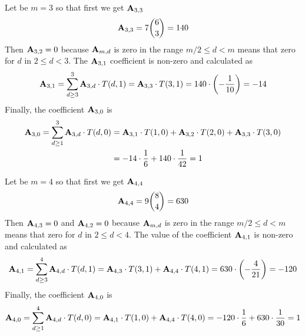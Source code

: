 \begin{examp}
    Let be $m=3$ so that first we get ${\mathbf{A}} \sb{3,3}$
    \begin{equation*}
        {\mathbf{A}} \sb{3,3} = 7 \binom{6}{3}= 140
    \end{equation*}
    Then ${\mathbf{A}} \sb{3,2} = 0$ because ${\mathbf{A}} \sb{m,d}$ is zero in the range $m/2 \leq d < m$ means that zero for $d$
    in $2 \leq d < 3$.
    The ${\mathbf{A}} \sb{3,1}$ coefficient is non-zero and calculated as
    \begin{equation*}
        \begin{split}
            {\mathbf{A}} \sb{3,1} = \sum_{d \geq 3}^{3} {\mathbf{A}} \sb{3,d} \cdot T(d,1) = {\mathbf{A}} \sb{3,3} \cdot T(3,1)
            = 140 \cdot \left( -\frac{1}{10} \right) = -14
        \end{split}
    \end{equation*}
    Finally, the coefficient ${\mathbf{A}} \sb{3,0}$ is
    \begin{equation*}
        \begin{split}
            {\mathbf{A}} \sb{3,0}= \sum_{d \geq 1}^{3} {\mathbf{A}} \sb{3,d} \cdot T(d,0)
            &= {\mathbf{A}} \sb{3,1} \cdot T(1,0) + {\mathbf{A}} \sb{3,2} \cdot T(2,0) + {\mathbf{A}} \sb{3,3} \cdot T(3,0) \\
            &= -14 \cdot \frac{1}{6} + 140 \cdot \frac{1}{42} = 1
        \end{split}
    \end{equation*}
\end{examp}
\begin{examp}
    Let be $m=4$ so that first we get ${\mathbf{A}} \sb{4,4}$
    \begin{equation*}
        {\mathbf{A}} \sb{4,4} = 9 \binom{8}{4}= 630
    \end{equation*}
    Then ${\mathbf{A}} \sb{4,3} = 0$ and ${\mathbf{A}} \sb{4,2} = 0$
    because ${\mathbf{A}} \sb{m,d}$ is zero in the range $m/2 \leq d < m$ means that zero for $d$ in $2 \leq d < 4$.
    The value of the coefficient ${\mathbf{A}} \sb{4,1}$ is non-zero and calculated as
    \begin{equation*}
        \begin{split}
            {\mathbf{A}} \sb{4,1}
            = \sum_{d \geq 3}^{4} {\mathbf{A}} \sb{4,d} \cdot T(d,1)
            = {\mathbf{A}} \sb{4,3} \cdot T(3,1) + {\mathbf{A}} \sb{4,4} \cdot T(4,1)
            = 630 \cdot \left( -\frac{4}{21} \right)
            = -120
        \end{split}
    \end{equation*}
    Finally, the coefficient ${\mathbf{A}} \sb{4,0}$ is
    \begin{equation*}
        \begin{split}
            {\mathbf{A}} \sb{4,0}
            = \sum_{d \geq 1}^{4} {\mathbf{A}} \sb{4,d} \cdot T(d, 0)
            = {\mathbf{A}} \sb{4,1} \cdot T(1, 0) + {\mathbf{A}} \sb{4,4} \cdot T(4, 0)
            = -120 \cdot \frac{1}{6} + 630 \cdot \frac{1}{30} = 1
        \end{split}
    \end{equation*}
\end{examp}
